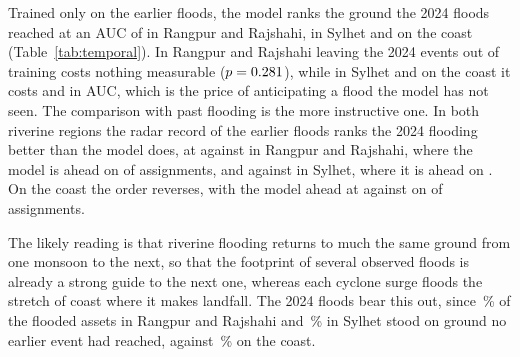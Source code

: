 Trained only on the earlier floods, the model ranks the ground the 2024 floods reached at an AUC of \RRTempAUC{} in Rangpur and Rajshahi, \SylhetTempAUC{} in Sylhet and \CoastalTempAUC{} on the coast (Table~\ref{tab:temporal}). In Rangpur and Rajshahi leaving the 2024 events out of training costs nothing measurable ($p=0.281{}$), while in Sylhet and on the coast it costs \SylhetTempAllGap{} and \CoastalTempAllGap{} in AUC, which is the price of anticipating a flood the model has not seen. The comparison with past flooding is the more instructive one. In both riverine regions the radar record of the earlier floods ranks the 2024 flooding better than the model does, at \RRTempPastAUC{} against \RRTempAUC{} in Rangpur and Rajshahi, where the model is ahead on \RRTempAheadPast{} of \RRTempSeeds{} assignments, and \SylhetTempPastAUC{} against \SylhetTempAUC{} in Sylhet, where it is ahead on \SylhetTempAheadPast{}. On the coast the order reverses, with the model ahead at \CoastalTempAUC{} against \CoastalTempPastAUC{} on \CoastalTempAheadPast{} of \CoastalTempSeeds{} assignments.

The likely reading is that riverine flooding returns to much the same ground from one monsoon to the next, so that the footprint of several observed floods is already a strong guide to the next one, whereas each cyclone surge floods the stretch of coast where it makes landfall. The 2024 floods bear this out, since \RRPastFeatUnseenPos{}\,\% of the flooded assets in Rangpur and Rajshahi and \SylhetPastFeatUnseenPos{}\,\% in Sylhet stood on ground no earlier event had reached, against \CoastalPastFeatUnseenPos{}\,\% on the coast.

